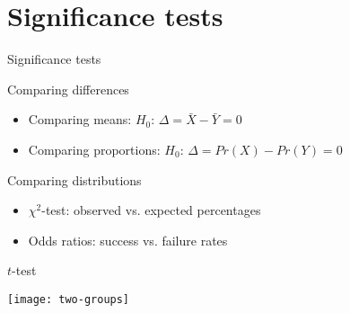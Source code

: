 \documentclass[t]{beamer}
\begin{document}
  \section{Significance tests}

  \begin{frame}[t]{Significance tests}

    \begin{block}{Comparing differences}

      \begin{itemize}
        \item Comparing means: $H_0$: $\Delta = \bar{X} - \bar{Y} = 0$ %
          \hfill {}
        \item Comparing proportions: $H_0$: $\Delta = Pr(X) - Pr(Y) = 0$ %
          \hfill {}
      \end{itemize}
    \end{block}
    
    \begin{block}{Comparing distributions}

      \begin{itemize}
        \item $\chi^2$-test: observed vs. expected percentages %
          \hfill {}
        \item Odds ratios: success vs. failure rates %
          \hfill {}
      \end{itemize}

    \end{block}

  \end{frame}

  \begin{frame}[c]{$t$-test}

    \texttt{[image: two-groups]}

  \end{frame}
    
\end{document}
